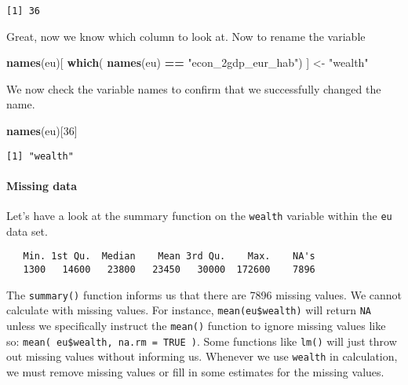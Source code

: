 \documentclass[]{article}
\newenvironment{Shaded}{\begin{snugshade}}{\end{snugshade}}
\newcommand{\DecValTok}[1]{\textcolor[rgb]{0.00,0.00,0.81}{#1}}
\newcommand{\KeywordTok}[1]{\textcolor[rgb]{0.13,0.29,0.53}{\textbf{#1}}}
\newcommand{\NormalTok}[1]{#1}
\newcommand{\OperatorTok}[1]{\textcolor[rgb]{0.81,0.36,0.00}{\textbf{#1}}}
\newcommand{\StringTok}[1]{\textcolor[rgb]{0.31,0.60,0.02}{#1}}
\let\oldparagraph\paragraph
\renewcommand{\paragraph}[1]{\oldparagraph{#1}\mbox{}}
\begin{document}
\begin{verbatim}
[1] 36
\end{verbatim}

Great, now we know which column to look at. Now to rename the variable

\begin{Shaded}
\begin{Highlighting}[]
\KeywordTok{names}\NormalTok{(eu)[ }\KeywordTok{which}\NormalTok{( }\KeywordTok{names}\NormalTok{(eu) }\OperatorTok{==}\StringTok{  "econ_2gdp_eur_hab"}\NormalTok{) ] <-}\StringTok{ "wealth"}
\end{Highlighting}
\end{Shaded}

We now check the variable names to confirm that we successfully changed the name.

\begin{Shaded}
\begin{Highlighting}[]
\KeywordTok{names}\NormalTok{(eu)[}\DecValTok{36}\NormalTok{]}
\end{Highlighting}
\end{Shaded}

\begin{verbatim}
[1] "wealth"
\end{verbatim}

\hypertarget{missing-data}{%
\paragraph{Missing data}\label{missing-data}}

Let's have a look at the summary function on the \texttt{wealth} variable within the \texttt{eu} data set.

\begin{Shaded}
\end{Shaded}

\begin{verbatim}
   Min. 1st Qu.  Median    Mean 3rd Qu.    Max.    NA's 
   1300   14600   23800   23450   30000  172600    7896 
\end{verbatim}

The \texttt{summary()} function informs us that there are 7896 missing values. We cannot calculate with missing values. For instance, \texttt{mean(eu\$wealth)} will return \texttt{NA} unless we specifically instruct the \texttt{mean()} function to ignore missing values like so: \texttt{mean(\ eu\$wealth,\ na.rm\ =\ TRUE\ )}. Some functions like \texttt{lm()} will just throw out missing values without informing us. Whenever we use \texttt{wealth} in calculation, we must remove missing values or fill in some estimates for the missing values.
\end{document}
